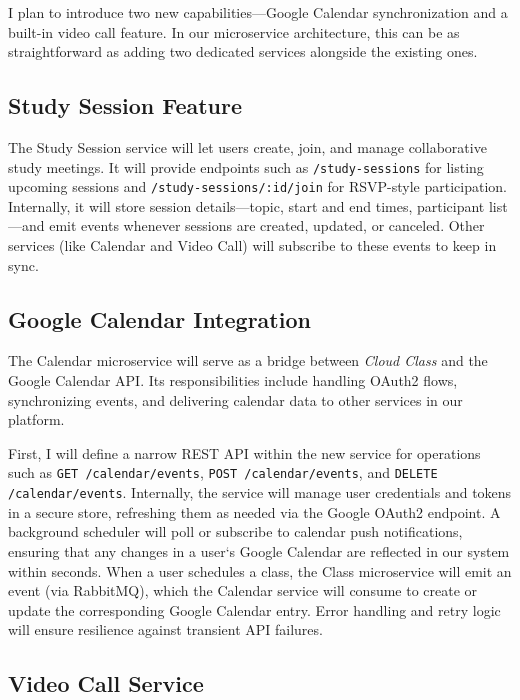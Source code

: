 I plan to introduce two new capabilities—Google Calendar synchronization and a built-in video call feature.  In our microservice architecture, this can be as straightforward as adding two dedicated services alongside the existing ones.

\subsection{Study Session Feature}

The Study Session service will let users create, join, and manage collaborative study meetings. It will provide endpoints such as \texttt{/study-sessions} for listing upcoming sessions and \texttt{/study-sessions/:id/join} for RSVP-style participation. Internally, it will store session details—topic, start and end times, participant list—and emit events whenever sessions are created, updated, or canceled. Other services (like Calendar and Video Call) will subscribe to these events to keep in sync.

\subsection{Google Calendar Integration}

The Calendar microservice will serve as a bridge between \emph{Cloud Class} and the Google Calendar API.  Its responsibilities include handling OAuth2 flows, synchronizing events, and delivering calendar data to other services in our platform.

First, I will define a narrow REST API within the new service for operations such as \texttt{GET /calendar/events}, \texttt{POST /calendar/events}, and \texttt{DELETE /calendar/events}.  Internally, the service will manage user credentials and tokens in a secure store, refreshing them as needed via the Google OAuth2 endpoint.  A background scheduler will poll or subscribe to calendar push notifications, ensuring that any changes in a user`s Google Calendar are reflected in our system within seconds.  When a user schedules a class, the Class microservice will emit an event (via RabbitMQ), which the Calendar service will consume to create or update the corresponding Google Calendar entry.  Error handling and retry logic will ensure resilience against transient API failures.

\subsection{Video Call Service}

